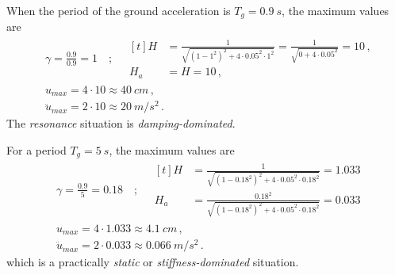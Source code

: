 \begin{Answer}[ref={frame_ground_acceleration}]
When the period of the ground acceleration is $T_g=\SI{0.9}{s}$, the maximum values are
\begin{align*}
&\gamma = \frac{0.9}{0.9} = 1 \quad ; \quad \begin{aligned}[t]
    H &= \frac{1}{\sqrt{(1-1^2)^2 + 4\cdot 0.05^2\cdot 1^2}} = \frac{1}{\sqrt{0 + 4\cdot 0.05^2}} = 10 \,, \\
    H_a &= H = 10 \,,
\end{aligned} \\
&u_{max} = 4 \cdot 10 \approx \SI{40}{cm} \,, \\
&\ddot{u}_{max} = 2 \cdot 10 \approx \SI{20}{m/s^2} \,.
\end{align*}
The \emph{resonance} situation is \emph{damping-dominated}.

For a period $T_g=\SI{5}{s}$, the maximum values are
\begin{align*}
&\gamma = \frac{0.9}{5} = 0.18 \quad ; \quad \begin{aligned}[t]
    H &= \frac{1}{\sqrt{(1-0.18^2)^2 + 4\cdot 0.05^2\cdot 0.18^2}} = 1.033 \\
    H_a &= \frac{0.18^2}{\sqrt{(1-0.18^2)^2 + 4\cdot 0.05^2\cdot 0.18^2}} = 0.033
\end{aligned} \\
&u_{max} = 4 \cdot 1.033 \approx \SI{4.1}{cm} \,, \\
&\ddot{u}_{max} = 2 \cdot 0.033 \approx \SI{0.066}{m/s^2} \,.
\end{align*}
which is a practically \emph{static} or \emph{stiffness-dominated} situation.

\end{Answer}
